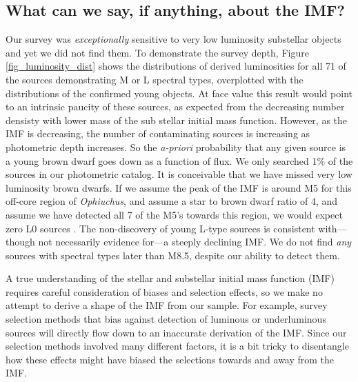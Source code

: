 \subsection{What can we say, if anything, about the IMF?}

Our survey was \emph{exceptionally} sensitive to very low luminosity substellar objects and yet we did not find them.  To demonstrate the survey depth, Figure \ref{fig_luminosity_dist} shows the distributions of derived luminosities for all 71 of the sources demonstrating M or L spectral types, overplotted with the distributions of the confirmed young objects.  At face value this result would point to an intrinsic paucity of these sources, as expected from the decreasing number densisty with lower mass of the sub stellar initial mass function.  However, as the IMF is decreasing, the number of contaminating sources is increasing as photometric depth increases.  So the \emph{a-priori} probability that any given source is a young brown dwarf goes down as a function of flux.  We only searched 1\% of the sources in our photometric catalog.  It is conceivable that we have missed very low luminosity brown dwarfs.  If we assume the peak of the IMF is around M5 for this off-core region of \emph{Ophiuchus}, and assume a star to brown dwarf ratio of 4, and assume we have detected all 7 of the M5's towards this region, we would expect zero L0 sources \citep{2012ARA&A..50...65L}.  The non-discovery of young L-type sources is consistent with---though not necessarily evidence for---a steeply declining IMF.  We do not find \emph{any} sources with spectral types later than M8.5, despite our ability to detect them.

A true understanding of the stellar and substellar initial mass function (IMF) requires careful consideration of biases and selection effects, so we make no attempt to derive a shape of the IMF from our sample.  For example, survey selection methods that bias against detection of luminous or underluminous sources will directly flow down to an inaccurate derivation of the IMF.  Since our selection methods involved many different factors, it is a bit tricky to disentangle how these effects might have biased the selections towards and away from the IMF.

